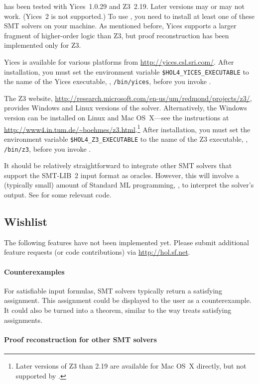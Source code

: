  has been tested with Yices~1.0.29 and Z3~2.19. Later
versions may or may not work.  (Yices~2 is not supported.)  To use
, you need to install at least one of these SMT solvers
on your machine.  As mentioned before, Yices supports a larger
fragment of higher-order logic than Z3, but proof reconstruction has
been implemented only for Z3.

Yices is available for various platforms from
\url{http://yices.csl.sri.com/}.  After installation, you must set the
environment variable {\tt \$HOL4\_YICES\_EXECUTABLE} to the name of
the Yices executable, \eg, {\tt /bin/yices}, before you invoke \HOL.

The Z3 website,
\url{http://research.microsoft.com/en-us/um/redmond/projects/z3/},
provides Windows and Linux versions of the solver.  Alternatively, the
Windows version can be installed on Linux and Mac OS~X---see the
instructions at
\url{http://www4.in.tum.de/~boehmes/z3.html}.\footnote{Later versions
  of Z3 than 2.19 are available for Mac OS~X directly, but not
  supported by \HOL.}  After installation, you must set the
environment variable {\tt \$HOL4\_Z3\_EXECUTABLE} to the name of the
Z3 executable, \eg, {\tt /bin/z3}, before you invoke \HOL.

It should be relatively straightforward to integrate other SMT solvers
that support the SMT-LIB~2 input format as oracles.  However, this
will involve a (typically small) amount of Standard ML programming,
\eg, to interpret the solver's output.  See  for some
relevant code.

\subsection{Wishlist}

The following features have not been implemented yet.  Please submit
additional feature requests (or code contributions) via
\url{http://hol.sf.net}.

\paragraph{Counterexamples}

For satisfiable input formulas, SMT solvers typically return a
satisfying assignment.  This assignment could be displayed to the
\HOL{} user as a counterexample.  It could also be turned into a
theorem, similar to the way  treats satisfying
assignments.

\paragraph{Proof reconstruction for other SMT solvers}


